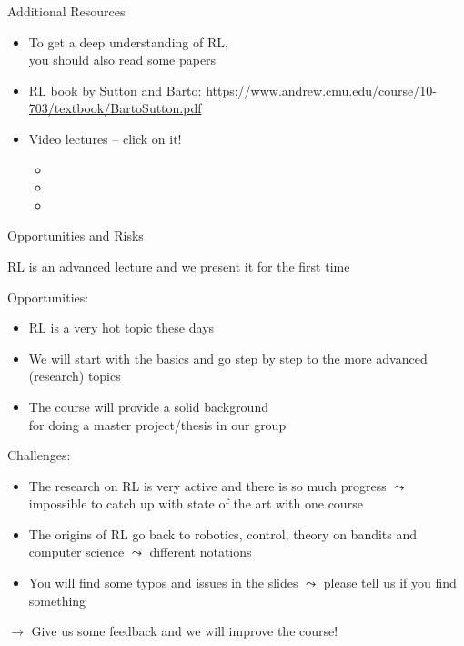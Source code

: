 \begin{frame}[c]{Additional Resources}
	
	\begin{itemize}
		\item To get a deep understanding of RL,\\ you should also read some papers 
		\item RL book by Sutton and Barto: 
		\url{https://www.andrew.cmu.edu/course/10-703/textbook/BartoSutton.pdf}
		\item Video lectures -- click on it!
		\begin{itemize}
			\item {}
			\item {}
			\item {}
		\end{itemize}
	\end{itemize}
	
\end{frame}
\begin{frame}[c]{Opportunities and Risks}
	
	RL is an advanced lecture and we present it for the first time
	
	\medskip
	\pause
	
	Opportunities:
	\begin{itemize}
		\item RL is a very hot topic these days
		\item We will start with the basics and go step by step to the more advanced (research) topics
		\item The course will provide a solid background\\ for doing a master project/thesis in our group 
	\end{itemize}
	
	\pause
	
	Challenges:
	\begin{itemize}
		\item The research on RL is very active and there is so much progress $\leadsto$ impossible to catch up with state of the art with one course
		\item The origins of RL go back to robotics, control, theory on bandits and computer science $\leadsto$ different notations
		\item You will find some typos and issues in the slides $\leadsto$ please tell us if you find something
	\end{itemize}
	
	\pause
	$\to$ Give us some feedback and we will improve the course!
	
	
\end{frame}
